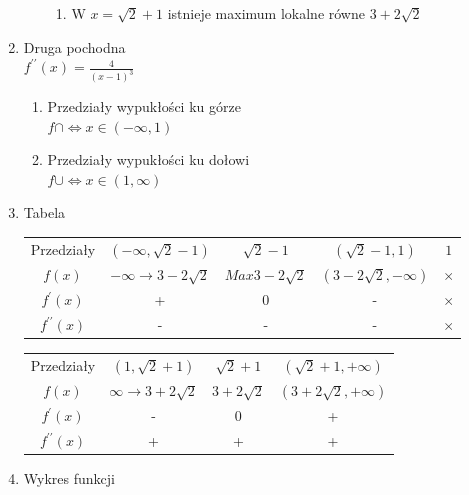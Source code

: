 \documentclass[11pt]{scrartcl}
\begin{document}
\begin{enumerate}
\begin{enumerate}
\begin{enumerate}
						\item W $ x = \sqrt{2} + 1 $ istnieje maximum lokalne równe $ 3+ 2\sqrt{2} $
					\end{enumerate}
			\end{enumerate}
		\item Druga pochodna \\
			$ f^{\prime\prime}(x) = \frac{4}{(x-1)^3} $
			\begin{enumerate}
				\item Przedziały wypukłości ku górze \\
				$ f\cap \Leftrightarrow x \in (-\infty, 1) $
				\item Przedziały wypukłości ku dołowi \\
				$ f\cup \Leftrightarrow x \in (1,\infty) $
			\end{enumerate}
		\item Tabela \\
			\begin{center}
				\begin{tabular}{ |c|c|c|c|c| }
					\hline
					Przedziały &
						$ (-\infty, \sqrt{2} -1) $ &
						$ \sqrt{2} -1 $ &
						$ (\sqrt{2} -1, 1) $ &
						$ 1 $ \\
					$ f(x) $ &
						$ -\infty \to 3 - 2\sqrt{2} $ &
						$ Max 3 - 2\sqrt{2} $ &
						$ (3 - 2\sqrt{2}, -\infty) $ &
						$ \times $ \\
					$ f^{\prime}(x) $ &
						+ &
						0 &
						- &
						$ \times $ \\
					$ f^{\prime\prime}(x) $ &
						- &
						- &
						- &
						$ \times $ \\
					\hline
				\end{tabular}
				\begin{tabular}{ |c|c|c|c| }
				\hline
				Przedziały &
					$ (1, \sqrt{2} + 1) $ &
					$ \sqrt{2} + 1 $ &
					$ (\sqrt{2} + 1, +\infty) $\\
				$ f(x) $ &
					$ \infty \to 3 + 2\sqrt{2} $ &
					$ 3 + 2\sqrt{2} $ &
					$ (3 + 2\sqrt{2}, + \infty) $ \\
				$ f^{\prime}(x) $ &
					- &
					0 &
					+  \\
				$ f^{\prime\prime}(x) $ &
					+ &
					+ &
					+  \\
				\hline
				\end{tabular}
			\end{center}
		\item Wykres funkcji \\
			\begin{center}

\end{center}
\end{enumerate}
\end{document}
